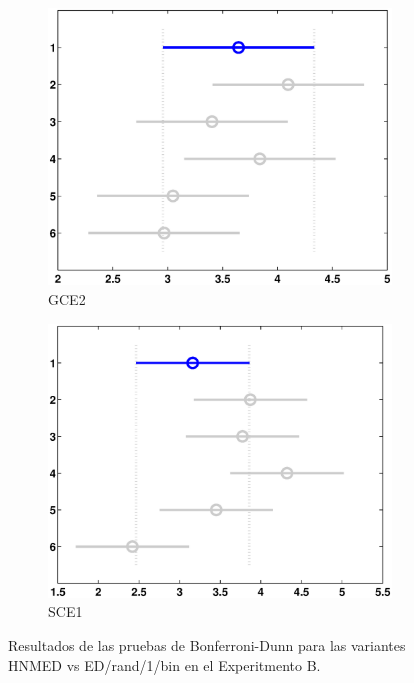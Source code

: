 \begin{figure}
\begin{subfigure}[b]{0.49\linewidth}
		\includegraphics[width=\linewidth]{Figures/B-Bonferroni_HNMED_VS_ED5}
		\caption{GCE2} \label{fig:Bon_G2} 
	\end{subfigure}
	\begin{subfigure}[b]{0.49\linewidth}
		\includegraphics[width=\linewidth]{Figures/B-Bonferroni_HNMED_VS_ED6}
		\caption{SCE1} \label{fig:Bon_S1} 
	\end{subfigure}
	\caption{Resultados de las pruebas de Bonferroni-Dunn para las variantes HNMED vs ED/rand/1/bin en el Experitmento B.} \label{fig: Resultados de las pruebas de Bonferroni-Dunn para las variantes HNMED vs ED/rand/1/bin en el Experitmento B} 
	
\end{figure}
%


